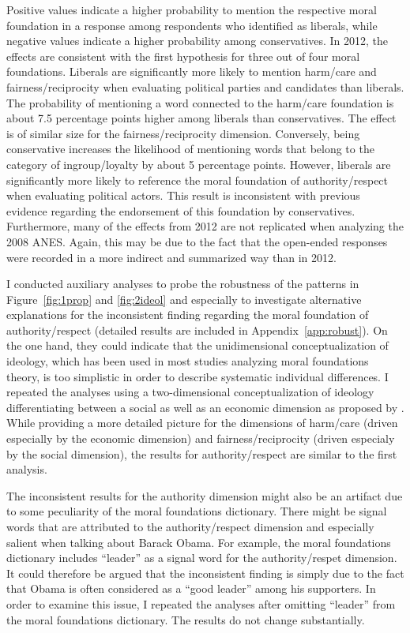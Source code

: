 \documentclass[12pt]{article}
\begin{document}
Positive values indicate a higher probability to mention the respective moral foundation in a response among respondents who identified as liberals, while negative values indicate a higher probability among conservatives. In 2012, the effects are consistent with the first hypothesis for three out of four moral foundations. Liberals are significantly more likely to mention harm/care and fairness/reciprocity when evaluating political parties and candidates than liberals. The probability of mentioning a word connected to the harm/care foundation is about 7.5 percentage points higher among liberals than conservatives. The effect is of similar size for the fairness/reciprocity dimension. Conversely, being conservative increases the likelihood of mentioning words that belong to the category of ingroup/loyalty by about 5 percentage points. However, liberals are significantly more likely to reference the moral foundation of authority/respect when evaluating political actors. This result is inconsistent with previous evidence regarding the endorsement of this foundation by conservatives. Furthermore, many of the effects from 2012 are not replicated when analyzing the 2008 ANES. Again, this may be due to the fact that the open-ended responses were recorded in a more indirect and summarized way than in 2012.

I conducted auxiliary analyses to probe the robustness of the patterns in Figure~\ref{fig:1prop} and \ref{fig:2ideol} and especially to investigate alternative explanations for the inconsistent finding regarding the moral foundation of authority/respect (detailed results are included in Appendix~\ref{app:robust}). On the one hand, they could indicate that the unidimensional conceptualization of ideology, which has been used in most studies analyzing moral foundations theory, is too simplistic in order to describe systematic individual differences. I repeated the analyses using a two-dimensional conceptualization of ideology differentiating between a social as well as an economic dimension as proposed by \citet{feldman2014understanding}. While providing a more detailed picture for the dimensions of harm/care (driven especially by the economic dimension) and fairness/reciprocity (driven especialy by the social dimension), the results for authority/respect are similar to the first analysis. 

The inconsistent results for the authority dimension might also be an artifact due to some peculiarity of the moral foundations dictionary. There might be signal words that are attributed to the authority/respect dimension and especially salient when talking about Barack Obama. For example, the moral foundations dictionary includes ``leader'' as a signal word for the authority/respet dimension. It could therefore be argued that the inconsistent finding is simply due to the fact that Obama is often considered as a ``good leader'' among his supporters. In order to examine this issue, I repeated the analyses after omitting ``leader'' from the moral foundations dictionary. The results do not change substantially.
\end{document}
